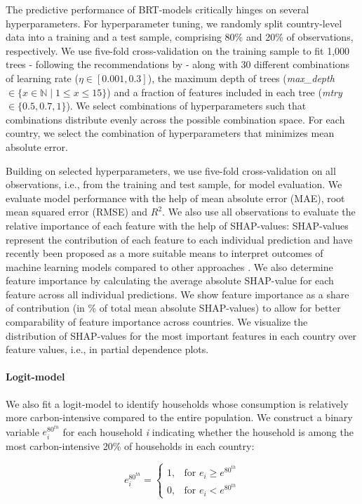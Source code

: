 \documentclass[12pt, a4paper]{article}
\begin{document}
The predictive performance of BRT-models critically hinges on several hyperparameters. For hyperparameter tuning, we randomly split country-level data into a training and a test sample, comprising 80\% and 20\% of observations, respectively. We use five-fold cross-validation on the training sample to fit 1,000 trees - following the recommendations by \textcite{Elith.2008} - along with 30 different combinations of learning rate ($\eta \in [0.001,0.3]$), the maximum depth of trees (\textit{max\_depth} $\in \{x \in \mathbb{N} \mid 1  \leq x \leq 15 \}$) and a fraction of features included in each tree (\textit{mtry} $\in \{0.5,0.7,1\}$). We select combinations of hyperparameters such that combinations distribute evenly across the possible combination space. For each country, we select the combination of hyperparameters that minimizes mean absolute error.

Building on selected hyperparameters, we use five-fold cross-validation on all observations, i.e., from the training and test sample, for model evaluation. We evaluate model performance with the help of mean absolute error (MAE), root mean squared error (RMSE) and $R^{2}$. We also use all observations to evaluate the relative importance of each feature with the help of SHAP-values: SHAP-values represent the contribution of each feature to each individual prediction and have recently been proposed as a more suitable means to interpret outcomes of machine learning models compared to other approaches \autocite{Lundberg.2020}. We also determine feature importance by calculating the average absolute SHAP-value for each feature across all individual predictions. We show feature importance as a share of contribution (in \% of total mean absolute SHAP-values) to allow for better comparability of feature importance across countries. We visualize the distribution of SHAP-values for the most important features in each country over feature values, i.e., in partial dependence plots. 

\paragraph{Logit-model} We also fit a logit-model to identify households whose consumption is relatively more carbon-intensive compared to the entire population. We construct a binary variable $e_{i}^{80^{th}}$ for each household \textit{i} indicating whether the household is among the most carbon-intensive 20\% of households in each country:

\begin{equation}
    e_{i}^{80^{th}} =
    \begin{cases}
    1, & \text{for }  e_{i} \geq e^{80^{th}} \\
    0, & \text{for }  e_{i} < e^{80^{th}}
    \end{cases}
\end{equation}
\end{document}
